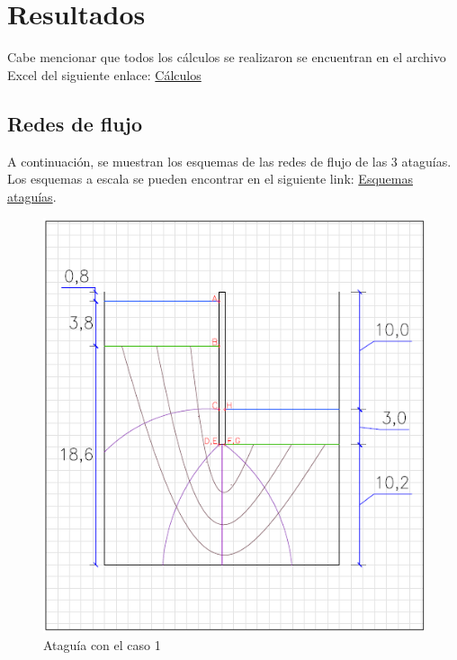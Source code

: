 \documentclass{article}
\begin{document}
\section{Resultados}
Cabe mencionar que todos los cálculos se realizaron se encuentran en el archivo Excel del siguiente enlace: \href{https://github.com/berckanala/Proyecto-1-MCOC/tree/main/Codigos_calculos}{Cálculos}
\subsection{Redes de flujo}
A continuación, se muestran los esquemas de las redes de flujo de las 3 ataguías. Los esquemas a escala se pueden encontrar en el siguiente link: \href{https://github.com/berckanala/Proyecto-1-MCOC/tree/main/redes_flujo}{Esquemas ataguías}.

\begin{figure}[h]
    \centering
    \begin{minipage}{0.32\textwidth}
        \centering
        \includegraphics[width=\textwidth]{graficos/At_caso1.png}
        \caption{Ataguía con el caso 1}
        \label{fig:At_caso1}
    \end{minipage}
    \hfill
    \begin{minipage}{0.32\textwidth}

\end{minipage}
\end{figure}
\end{document}
